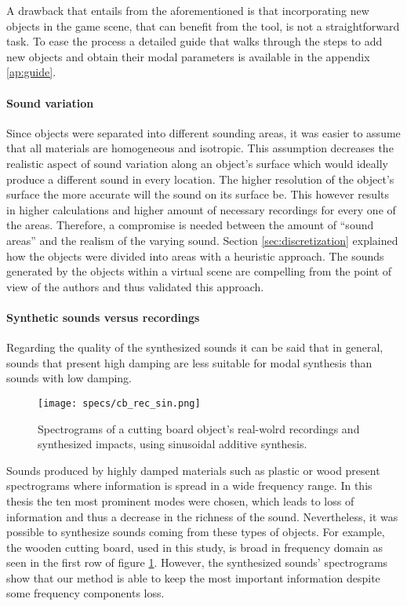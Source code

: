 A drawback that entails from the aforementioned is that incorporating new objects in the game scene, that can benefit from the tool, is not a straightforward task. To ease the process a detailed guide that walks through the steps to add new objects and obtain their modal parameters is available in the appendix \ref{ap:guide}. 

\paragraph{Sound variation}
\hfill \break

Since objects were separated into different sounding areas, it was easier to assume that all materials are homogeneous and isotropic. This assumption decreases the realistic aspect of sound variation along an object's surface which would ideally produce a different sound in every location. The higher resolution of the object's surface the more accurate will the sound on its surface be. This however results in higher calculations and higher amount of necessary recordings for every one of the areas. Therefore, a compromise is needed between the amount of ``sound areas'' and the realism of the varying sound. Section \ref{sec:discretization} explained how the objects were divided into areas with a heuristic approach. The sounds generated by the objects within a virtual scene are compelling from the point of view of the authors and thus validated this approach.



\paragraph{Synthetic sounds versus recordings}
\hfill \break

Regarding the quality of the synthesized sounds it can be said that in general, sounds that present high damping are less suitable for modal synthesis than sounds with low damping. 

\begin{figure}[H]
  \centering
    \texttt{[image: specs/cb\_rec\_sin.png]}
      \caption{Spectrograms of a cutting board object's real-wolrd recordings and synthesized impacts, using sinusoidal additive synthesis.}
      \label{fig:specs_cb}
\end{figure}

Sounds produced by highly damped materials such as plastic or wood present spectrograms where information is spread in a wide frequency range. In this thesis the ten most prominent modes were chosen, which leads to loss of information and thus a decrease in the richness of the sound. Nevertheless, it was possible to synthesize sounds coming from these types of objects. For example, the wooden cutting board, used in this study, is broad in frequency domain as seen in the first row of figure \ref{fig:specs_cb}. However, the synthesized sounds' spectrograms show that our method is able to keep the most important information despite some frequency components loss. 

